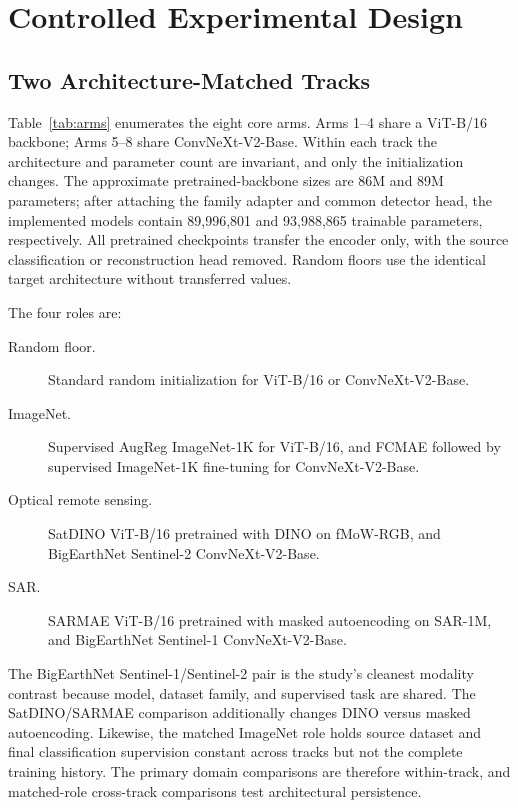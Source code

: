 \section{Controlled Experimental Design}
\label{sec:design}

\subsection{Two Architecture-Matched Tracks}

Table~\ref{tab:arms} enumerates the eight core arms. Arms 1--4 share a
ViT-B/16 backbone; Arms 5--8 share ConvNeXt-V2-Base. Within each track the
architecture and parameter count are invariant, and only the initialization
changes. The approximate pretrained-backbone sizes are 86M and 89M
parameters; after attaching the family adapter and common detector head, the
implemented models contain 89,996,801 and 93,988,865 trainable parameters,
respectively. All pretrained checkpoints transfer the encoder only, with the
source classification or reconstruction head removed. Random floors use the
identical target architecture without transferred values.



The four roles are:

\begin{description}
  \item[Random floor.] Standard random initialization for ViT-B/16 or
    ConvNeXt-V2-Base.
  \item[ImageNet.] Supervised AugReg ImageNet-1K for ViT-B/16, and
    FCMAE followed by supervised ImageNet-1K fine-tuning for
    ConvNeXt-V2-Base.
  \item[Optical remote sensing.] SatDINO ViT-B/16 pretrained with DINO on
    fMoW-RGB, and BigEarthNet Sentinel-2 ConvNeXt-V2-Base.
  \item[SAR.] SARMAE ViT-B/16 pretrained with masked autoencoding on SAR-1M,
    and BigEarthNet Sentinel-1 ConvNeXt-V2-Base.
\end{description}

The BigEarthNet Sentinel-1/Sentinel-2 pair is the study's cleanest modality
contrast because model, dataset family, and supervised task are shared. The
SatDINO/SARMAE comparison additionally changes DINO versus masked
autoencoding. Likewise, the matched ImageNet role holds source dataset and
final classification supervision constant across tracks but not the complete
training history. The primary domain comparisons are therefore within-track,
and matched-role cross-track comparisons test architectural persistence.

